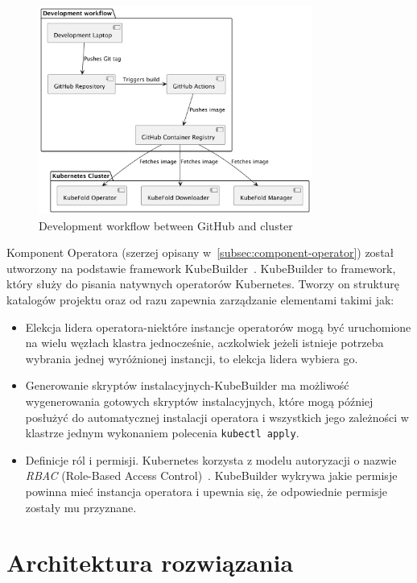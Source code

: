 \begin{figure}[htbp]
    \centering
    \includegraphics[width=0.8\textwidth]{images/images}
    \caption{Development workflow between GitHub and cluster}
    \label{fig:docker-images-flow}
\end{figure}

Komponent Operatora (szerzej opisany w~\ref{subsec:component-operator}) został utworzony na podstawie framework KubeBuilder~\cite{kubebuilder}.
KubeBuilder to framework, który służy do pisania natywnych operatorów Kubernetes.
Tworzy on strukturę katalogów projektu oraz od razu zapewnia zarządzanie elementami takimi jak:
\begin{itemize}
    \item Elekcja lidera operatora-niektóre instancje operatorów mogą być uruchomione na wielu węzłach klastra jednocześnie, aczkolwiek jeżeli istnieje potrzeba wybrania jednej wyróżnionej instancji, to elekcja lidera wybiera go.
    \item Generowanie skryptów instalacyjnych-KubeBuilder ma możliwość wygenerowania gotowych skryptów instalacyjnych, które mogą później posłużyć do automatycznej instalacji operatora i wszystkich jego zależności w klastrze jednym wykonaniem polecenia \texttt{kubectl apply}.
    \item Definicje ról i permisji.
    Kubernetes korzysta z modelu autoryzacji o nazwie \textit{RBAC} (Role-Based Access Control)~\cite{k8s_rbac}.
    KubeBuilder wykrywa jakie permisje powinna mieć instancja operatora i upewnia się, że odpowiednie permisje zostały mu przyznane.
\end{itemize}


\section{Architektura rozwiązania}


